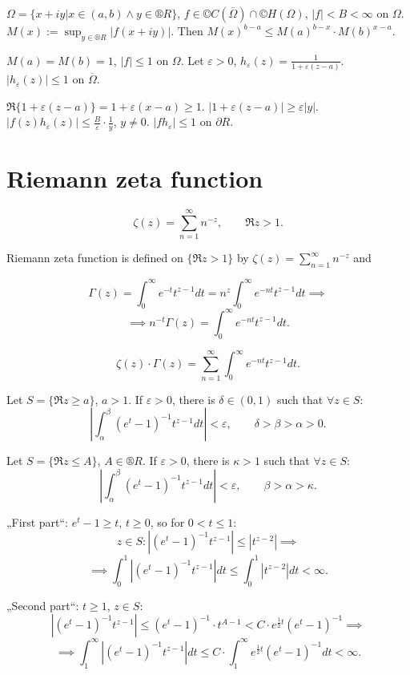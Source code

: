 \documentclass[12pt]{article}					%
\begin{document}
\begin{veta}
	$Ω = \{x + i y | x \in (a, b) \land y \in ®R\}$, $f \in ©C(\overline{Ω}) \cap ©H(Ω)$, $|f| < B < ∞$ on $Ω$. $M(x) := \sup_{y \in ®R} |f(x + i y)|$. Then $M(x)^{b - a} ≤ M(a)^{b - x} · M(b)^{x - a}$.

	\begin{dukazin}
		$M(a) = M(b) = 1$, $|f| ≤ 1$ on $Ω$. Let $ε > 0$, $h_ε(z) = \frac{1}{1 + ε(z - a)}$. $|h_ε(z)| ≤ 1$ on $\overline{Ω}$.

		$\Re\{1 + ε(z - a)\} = 1 + ε(x - a) ≥ 1$. $|1 + ε(z - a)| ≥ ε|y|$. $|f(z) h_ε(z)| ≤ \frac{B}{ε}·\frac{1}{y}$, $y ≠ 0$. $|f h_ε| ≤ 1$ on $\partial R$.
	\end{dukazin}
\end{veta}


\section{Riemann zeta function}
\begin{poznamka}
	$$ ζ(z) = \sum_{n=1}^∞ n^{-z}, \qquad \Re z > 1. $$
\end{poznamka}

\begin{definice}
	Riemann zeta function is defined on $\{\Re z > 1\}$ by $ζ(z) = \sum_{n=1}^∞ n^{-z}$ and $ $

	\begin{poznamkain}
		$$ Γ(z) = \int_0^∞ e^{-t} t^{z - 1} dt = n^z \int_0^∞ e^{-n t} t^{z - 1} dt \implies $$
		$$ \implies n^{-t} Γ(z) = \int_0^∞ e^{-n t} t^{z - 1} dt. $$

		$$ ζ(z)·Γ(z) = \sum_{n=1}^∞ \int_0^∞ e^{-n t} t^{z - 1} dt. $$
	\end{poznamkain}
\end{definice}

\begin{lemma}
	Let $S = \{\Re z ≥ a\}$, $a > 1$. If $ε > 0$, there is $δ \in (0, 1)$ such that $\forall z \in S$:
	$$ \left|\int_α^β (e^t - 1)^{-1} t^{z - 1} dt\right| < ε, \qquad δ > β > α > 0. $$

	Let $S = \{\Re z ≤ A\}$, $A \in ®R$. If $ε > 0$, there is $κ > 1$ such that $\forall z \in S$:
	$$ \left|\int_α^β (e^t - 1)^{-1} t^{z - 1} dt\right| < ε, \qquad β > α > κ. $$

	\begin{dukazin}
		„First part“: $e^t - 1 ≥ t$, $t ≥ 0$, so for $0 < t ≤ 1$:
		$$ z \in S: \left|(e^t - 1)^{-1} t^{z - 1}\right| ≤ |t^{z - 2}| \implies $$
		$$ \implies \int_0^1 \left|(e^t - 1)^{-1} t^{z - 1}\right| dt ≤ \int_0^1 |t^{z - 2}| dt < ∞. $$

		„Second part“: $t ≥ 1$, $z \in S$:
		$$ \left|(e^t - 1)^{-1} t^{z - 1}\right| ≤ (e^t - 1)^{-1}·t^{A - 1} < C·e^{\frac{1}{2} t} (e^t - 1)^{-1} \implies $$
		$$ \implies \int_1^∞ \left|(e^t - 1)^{-1} t^{z - 1}\right| dt ≤ C·\int_1^∞ e^{\frac{1}{2} t}(e^t - 1)^{-1} dt < ∞. $$
	\end{dukazin}
\end{lemma}
\end{document}
